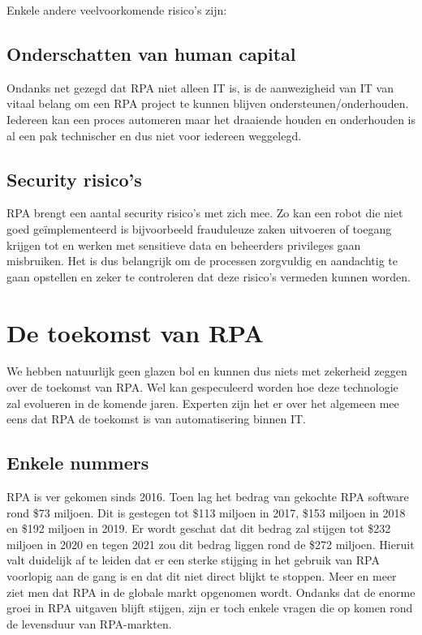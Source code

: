 Enkele andere veelvoorkomende risico's zijn:

\subsection{Onderschatten van human capital}
Ondanks net gezegd dat RPA niet alleen IT is, is de aanwezigheid van IT van vitaal belang om een RPA project te kunnen blijven ondersteunen/onderhouden. Iedereen kan een proces automeren maar het draaiende houden en onderhouden is al een pak technischer en dus niet voor iedereen weggelegd. \autocite{everythingRPA}

\subsection{Security risico's}
RPA brengt een aantal security risico's met zich mee. Zo kan een robot die niet goed geïmplementeerd is bijvoorbeeld frauduleuze zaken uitvoeren of toegang krijgen tot en werken met sensitieve data en beheerders privileges gaan misbruiken. Het is dus belangrijk om de processen zorgvuldig en aandachtig te gaan opstellen en zeker te controleren dat deze risico's vermeden kunnen worden. \autocite{everythingRPA} \autocite{predictionRPA}

\section{De toekomst van RPA}
We hebben natuurlijk geen glazen bol en kunnen dus niets met zekerheid zeggen over de toekomst van RPA. Wel kan gespeculeerd worden hoe deze technologie zal evolueren in de komende jaren. Experten zijn het er over het algemeen mee eens dat RPA de toekomst is van automatisering binnen IT. \autocite{futRPA}

\subsection{Enkele nummers}
RPA is ver gekomen sinds 2016. Toen lag het bedrag van gekochte RPA software rond \$73 miljoen. Dit is gestegen tot \$113 miljoen in 2017, \$153 miljoen in 2018 en \$192 miljoen in 2019. Er wordt geschat dat dit bedrag zal stijgen tot \$232 miljoen in 2020 en tegen 2021 zou dit bedrag liggen rond de \$272 miljoen. Hieruit valt duidelijk af te leiden dat er een sterke stijging in het gebruik van RPA voorlopig aan de gang is en dat dit niet direct blijkt te stoppen. Meer en meer ziet men dat RPA in de globale markt opgenomen wordt. \autocite{futRPA} Ondanks dat de enorme groei in RPA uitgaven blijft stijgen, zijn er toch enkele vragen die op komen rond de levensduur van RPA-markten. \autocite{everythingRPA}

